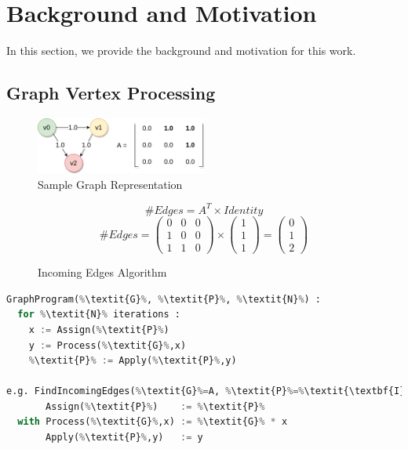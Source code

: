 \section{Background and Motivation}

In this section, we provide the background and motivation for this work.

\subsection{Graph Vertex Processing}

\begin{figure}[htbp]
\centering
\includegraphics[width=0.5\textwidth]{figures/sample_graph}
\caption{Sample Graph Representation}
\label{fig:sample_graph}
\end{figure}

\begin{figure}[ htbp ] 
\begin{equation}
\#Edges = A^{T} \times Identity
\end{equation}
\begin{equation}
\#Edges = 
\left(\begin{array}{ccc} 0 & 0 & 0 \\ 1 & 0 & 0 \\ 1 & 1 & 0 \end{array}\right) \times
\left(\begin{array}{c} 1 \\ 1 \\ 1 \end{array}\right) 
= \left(\begin{array}{c} 0 \\ 1 \\ 2 \end{array}\right) 
\end{equation}
\caption{Incoming Edges Algorithm}
\label{fig:sample_algorithm}
\end{figure} 

\begin{lstlisting}[emph={Assign, Process, Apply}, emphstyle=\color{blue}, numbers=none, escapechar=\%, language=Python, caption=Graph Vertex Processing Model]
GraphProgram(%\textit{G}%, %\textit{P}%, %\textit{N}%) :
  for %\textit{N}% iterations :
    x := Assign(%\textit{P}%)
  	y := Process(%\textit{G}%,x)
  	%\textit{P}% := Apply(%\textit{P}%,y)	  
  
e.g. FindIncomingEdges(%\textit{G}%=A, %\textit{P}%=%\textit{\textbf{I}}%, %\textit{N}%=1) :
       Assign(%\textit{P}%)    := %\textit{P}%
  with Process(%\textit{G}%,x) := %\textit{G}% * x
       Apply(%\textit{P}%,y)   := y
\end{lstlisting}

